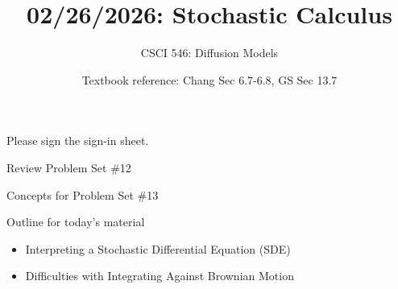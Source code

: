 \documentclass[10pt]{beamer}
\begin{document}




\title{02/26/2026: Stochastic Calculus}
\author{CSCI 546: Diffusion Models}
\date{Textbook reference: Chang Sec 6.7-6.8, GS Sec  13.7}

\begin{frame}
    \titlepage 
\end{frame}

\begin{frame}

\begin{mygreenbox}[title=Announcement (Sign-in Sheet)]
Please sign the sign-in sheet.
\end{mygreenbox}

\vfill 


%
	
\end{frame}

\begin{frame}[standout]
Review Problem Set \#12
\end{frame}

\begin{frame}[standout]
Concepts for Problem Set \#13
\end{frame}


\begin{frame}[standout]
Outline for today's material
\begin{itemize}
\item \textbullet \quad \alert{Interpreting a Stochastic Differential Equation (SDE)}
\item \textbullet \quad Difficulties with Integrating Against Brownian Motion
\end{itemize}

\end{frame}
\end{document}
